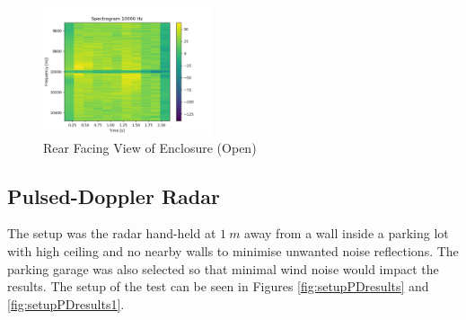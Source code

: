 \begin{figure}[h!]
    \centering
    \includegraphics[width = 0.4464\textwidth]{images/CWResults3.pdf}
    \caption{Rear Facing View of Enclosure (Open)}\label{fig:CWResults3}
\end{figure}

\newpage
\subsection{Pulsed-Doppler Radar \label{section:PDResults}}
The setup was the radar hand-held at $1\ m$ away from a wall inside a parking lot with high ceiling and no nearby walls to minimise unwanted noise reflections. The parking garage was also selected so that minimal wind noise would impact the results. The setup of the test can be seen in Figures \ref{fig:setupPDresults} and \ref{fig:setupPDresults1}.

